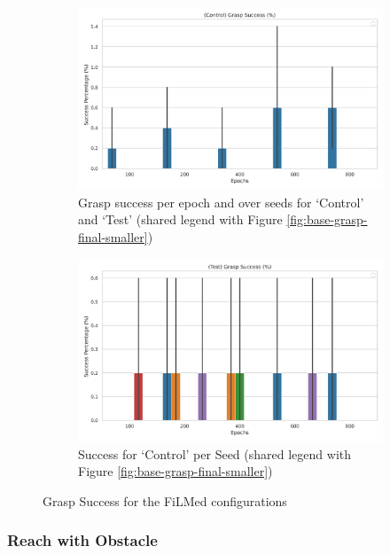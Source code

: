 \begin{figure}[htpb]
  \centering
  \begin{subfigure}{0.45\linewidth}
    \centering
    \includegraphics[width=\linewidth]{assets/evaluation/baseline/base-smaller-grasp-control-success-cams-epochs.png}
    \caption{Grasp success per epoch and over seeds for `Control' and `Test' (shared legend with Figure \ref{fig:base-grasp-final-smaller})}\label{subfig:base-grasp-control-success-smaller}
  \end{subfigure}
  \hfill
  \begin{subfigure}{0.45\linewidth}
    \centering
    \includegraphics[width=\linewidth]{assets/evaluation/baseline/base-smaller-grasp-test-success-cams-epochs.png}
    \caption{Success for `Control' per Seed (shared legend with Figure \ref{fig:base-grasp-final-smaller})}\label{subfig:base-grasp-test-success-smaller}
  \end{subfigure}
  
  \caption{Grasp Success for the FiLMed configurations}\label{fig:base-grasp-success-smaller}
\end{figure}

\subsubsection{Reach with Obstacle}

